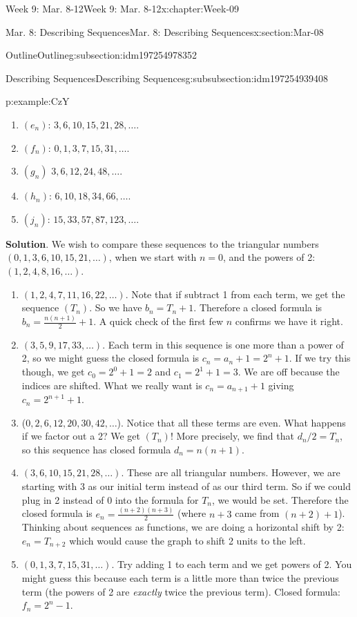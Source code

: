 \documentclass[oneside,10pt,]{book}
\newcommand{\blocktitlefont}{\relax}
\numberwithin{equation}{section}
\begin{document}
\begin{chapterptx}{Week 9: Mar. 8-12}{}{Week 9: Mar. 8-12}{}{}{x:chapter:Week-09}
\begin{sectionptx}{Mar. 8: Describing Sequences}{}{Mar. 8: Describing Sequences}{}{}{x:section:Mar-08}
\begin{subsectionptx}{Outline}{}{Outline}{}{}{g:subsection:idm197254978352}
\begin{subsubsectionptx}{Describing Sequences}{}{Describing Sequences}{}{}{g:subsubsection:idm197254939408}
\begin{example}{}{p:example:CzY}
\begin{enumerate}
\item{}\((e_n)\): \(3, 6, 10, 15, 21, 28, \ldots\).%
\item{}\((f_n)\): \(0, 1, 3, 7, 15, 31, \ldots \).%
\item{}\((g_n)\) \(3, 6, 12, 24, 48, \ldots \).%
\item{}\((h_n)\): \(6, 10, 18, 34, 66, \ldots \).%
\item{}\((j_n)\): \(15, 33, 57, 87, 123, \ldots\).%
\end{enumerate}
%
\par\smallskip%
\noindent\textbf{\blocktitlefont Solution}.\hypertarget{p:solution:bcI}{}\quad{} We wish to compare these sequences to the triangular numbers \((0, 1, 3, 6, 10, 15, 21,\ldots)\), when we start with \(n=0\), and the powers of 2: \((1, 2, 4, 8, 16, \ldots)\).%
\begin{enumerate}
\item{}\((1, 2, 4, 7, 11, 16, 22, \ldots)\). Note that if subtract 1 from each term, we get the sequence \((T_n)\). So we have \(b_n = T_n + 1\). Therefore a closed formula is \(b_n = \frac{n(n+1)}{2} + 1\). A quick check of the first few \(n\) confirms we have it right.%
\item{}\((3, 5, 9, 17, 33, \ldots )\). Each term in this sequence is one more than a power of 2, so we might guess the closed formula is \(c_n = a_n+1 = 2^n + 1\). If we try this though, we get \(c_0 = 2^0 + 1 = 2\) and \(c_1 = 2^1 + 1 = 3\). We are off because the indices are shifted. What we really want is \(c_n = a_{n+1}+1\) giving \(c_n = 2^{n+1} + 1\).%
\item{}(\(0, 2, 6, 12, 20, 30, 42,\ldots \)). Notice that all these terms are even. What happens if we factor out a 2? We get \((T_n)\)! More precisely, we find that \(d_n/2 = T_n\), so this sequence has closed formula \(d_n = n(n+1)\).%
\item{}\((3, 6, 10, 15, 21, 28, \ldots)\). These are all triangular numbers. However, we are starting with 3 as our initial term instead of as our third term. So if we could plug in 2 instead of 0 into the formula for \(T_n\), we would be set. Therefore the closed formula is \(e_n = \frac{(n+2)(n+3)}{2}\) (where \(n+3\) came from \((n+2)+1\)). Thinking about sequences as functions, we are doing a horizontal shift by 2: \(e_n = T_{n+2}\) which would cause the graph to shift 2 units to the left.%
\item{}\((0, 1, 3, 7, 15, 31, \ldots )\). Try adding 1 to each term and we get powers of 2. You might guess this because each term is a little more than twice the previous term (the powers of 2 are \emph{exactly} twice the previous term). Closed formula: \(f_n = 2^{n} - 1\).%

\end{enumerate}
\end{example}
\end{subsubsectionptx}
\end{subsectionptx}
\end{sectionptx}
\end{chapterptx}
\end{document}

